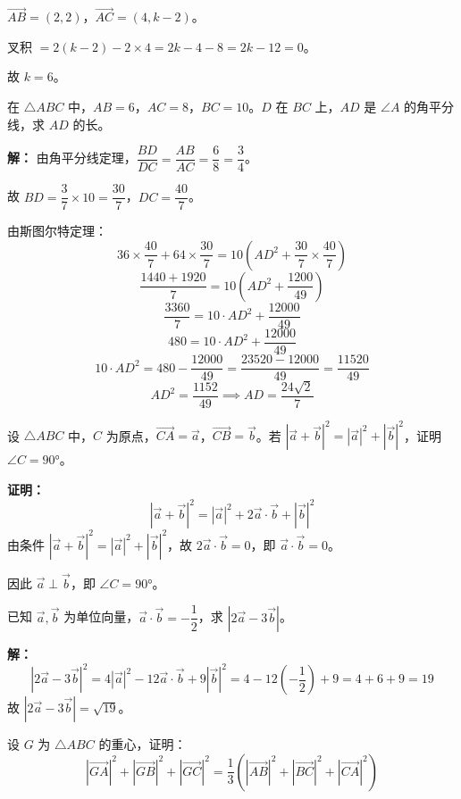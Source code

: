 \documentclass[12pt, a4paper]{ctexart}
\begin{document}
$\overrightarrow{AB} = (2,2)$，$\overrightarrow{AC} = (4,k-2)$。

叉积 $= 2(k-2) - 2 \times 4 = 2k - 4 - 8 = 2k - 12 = 0$。

故 $k = 6$。

\begin{examplebox}[【例题8】斯图尔特定理求线段比]
在 $\triangle ABC$ 中，$AB=6$，$AC=8$，$BC=10$。$D$ 在 $BC$ 上，$AD$ 是 $\angle A$ 的角平分线，求 $AD$ 的长。
\end{examplebox}

\textbf{解：} 由角平分线定理，$\dfrac{BD}{DC} = \dfrac{AB}{AC} = \dfrac{6}{8} = \dfrac{3}{4}$。

故 $BD = \dfrac{3}{7} \times 10 = \dfrac{30}{7}$，$DC = \dfrac{40}{7}$。

由斯图尔特定理：
\[
36 \times \frac{40}{7} + 64 \times \frac{30}{7} = 10\left(AD^2 + \frac{30}{7} \times \frac{40}{7}\right)
\]
\[
\frac{1440 + 1920}{7} = 10\left(AD^2 + \frac{1200}{49}\right)
\]
\[
\frac{3360}{7} = 10 \cdot AD^2 + \frac{12000}{49}
\]
\[
480 = 10 \cdot AD^2 + \frac{12000}{49}
\]
\[
10 \cdot AD^2 = 480 - \frac{12000}{49} = \frac{23520 - 12000}{49} = \frac{11520}{49}
\]
\[
AD^2 = \frac{1152}{49} \implies AD = \frac{24\sqrt{2}}{7}
\]

\begin{examplebox}[【例题9】用向量证明勾股定理逆定理]
设 $\triangle ABC$ 中，$C$ 为原点，$\overrightarrow{CA}=\vec{a}$，$\overrightarrow{CB}=\vec{b}$。若 $|\vec{a}+\vec{b}|^2 = |\vec{a}|^2 + |\vec{b}|^2$，证明 $\angle C = 90°$。
\end{examplebox}

\textbf{证明：}
\[
|\vec{a}+\vec{b}|^2 = |\vec{a}|^2 + 2\vec{a}\cdot\vec{b} + |\vec{b}|^2
\]
由条件 $|\vec{a}+\vec{b}|^2 = |\vec{a}|^2 + |\vec{b}|^2$，故 $2\vec{a}\cdot\vec{b} = 0$，即 $\vec{a}\cdot\vec{b} = 0$。

因此 $\vec{a} \perp \vec{b}$，即 $\angle C = 90°$。

\begin{examplebox}[【例题10】综合运用极化恒等式与三角不等式]
已知 $\vec{a}, \vec{b}$ 为单位向量，$\vec{a}\cdot\vec{b} = -\dfrac{1}{2}$，求 $|2\vec{a} - 3\vec{b}|$。
\end{examplebox}

\textbf{解：}
\[
|2\vec{a}-3\vec{b}|^2 = 4|\vec{a}|^2 - 12\vec{a}\cdot\vec{b} + 9|\vec{b}|^2 = 4 - 12\left(-\frac{1}{2}\right) + 9 = 4 + 6 + 9 = 19
\]
故 $|2\vec{a}-3\vec{b}| = \sqrt{19}$。

\begin{examplebox}[【例题11】向量恒等式证明中线性质]
设 $G$ 为 $\triangle ABC$ 的重心，证明：
\[
|\overrightarrow{GA}|^2 + |\overrightarrow{GB}|^2 + |\overrightarrow{GC}|^2 = \frac{1}{3}\left(|\overrightarrow{AB}|^2 + |\overrightarrow{BC}|^2 + |\overrightarrow{CA}|^2\right)
\]
\end{examplebox}
\end{document}
